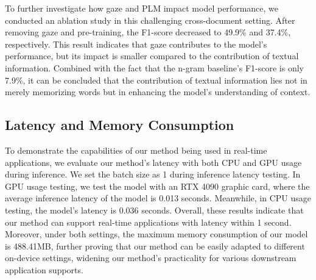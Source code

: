 To further investigate how gaze and PLM impact model performance, we conducted an ablation study in this challenging cross-document setting. After removing gaze and pre-training, the F1-score decreased to 49.9\% and 37.4\%, respectively. This result indicates that gaze contributes to the model's performance, but its impact is smaller compared to the contribution of textual information. Combined with the fact that the n-gram baseline's F1-score is only 7.9\%, it can be concluded that the contribution of textual information lies not in merely memorizing words but in enhancing the model's understanding of context.



\subsection{Latency and Memory Consumption}
To demonstrate the capabilities of our method being used in real-time applications, we evaluate our method's latency with both CPU and GPU usage during inference. We set the batch size as 1 during inference latency testing. In GPU usage testing, we test the model with an RTX 4090 graphic card, where the average inference latency of the model is 0.013 seconds. Meanwhile, in CPU usage testing, the model's latency is 0.036 seconds. Overall, these results indicate that our method can support real-time applications with latency within 1 second. Moreover, under both settings, the maximum memory consumption of our model is 488.41MB, further proving that our method can be easily adapted to different on-device settings, widening our method's practicality for various downstream application supports.
